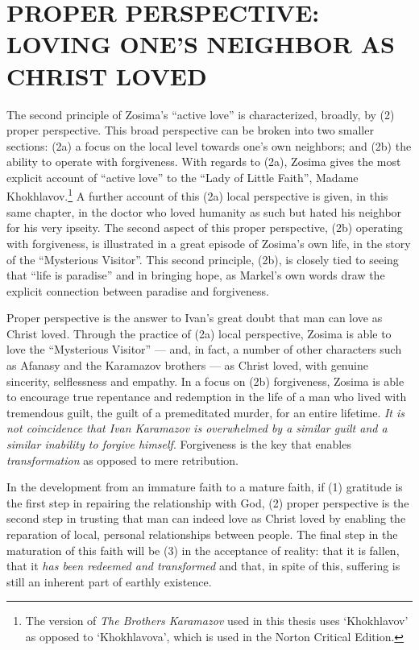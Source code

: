\chapter{PROPER PERSPECTIVE: LOVING ONE'S NEIGHBOR AS CHRIST LOVED}
	The second principle of Zosima's ``active love'' is characterized, broadly, by (2) proper perspective. This broad perspective can be broken into two smaller sections: (2a) a focus on the local level towards one's own neighbors; and (2b) the ability to operate with forgiveness. With regards to (2a), Zosima gives the most explicit account of ``active love'' to the ``Lady of Little Faith'', Madame Khokhlavov.\footnote{The version of \emph{The Brothers Karamazov} used in this thesis uses `Khokhlavov' as opposed to `Khokhlavova', which is used in the Norton Critical Edition.} A further account of this (2a) local perspective is given, in this same chapter, in the doctor who loved humanity as such but hated his neighbor for his very ipseity. The second aspect of this proper perspective, (2b) operating with forgiveness, is illustrated in a great episode of Zosima's own life, in the story of the ``Mysterious Visitor''. This second principle, (2b), is closely tied to seeing that ``life is paradise'' and in bringing hope, as Markel's own words draw the explicit connection between paradise and forgiveness.
	
	Proper perspective is the answer to Ivan's great doubt that man can love as Christ loved. Through the practice of (2a) local perspective, Zosima is able to love the ``Mysterious Visitor'' --- and, in fact, a number of other characters such as Afanasy and the Karamazov brothers --- as Christ loved, with genuine sincerity, selflessness and empathy. In a focus on (2b) forgiveness, Zosima is able to encourage true repentance and redemption in the life of a man who lived with tremendous guilt, the guilt of a premeditated murder, for an entire lifetime. \emph{It is not coincidence that Ivan Karamazov is overwhelmed by a similar guilt and a similar inability to forgive himself}. Forgiveness is the key that enables \emph{transformation} as opposed to mere retribution. 
	
	In the development from an immature faith to a mature faith, if (1) gratitude is the first step in repairing the relationship with God, (2) proper perspective is the second step in trusting that man can indeed love as Christ loved by enabling the reparation of local, personal relationships between people. The final step in the maturation of this faith will be (3) in the acceptance of reality: that it is fallen, that it \emph{has been redeemed and transformed} and that, in spite of this, suffering is still an inherent part of earthly existence.
	 
